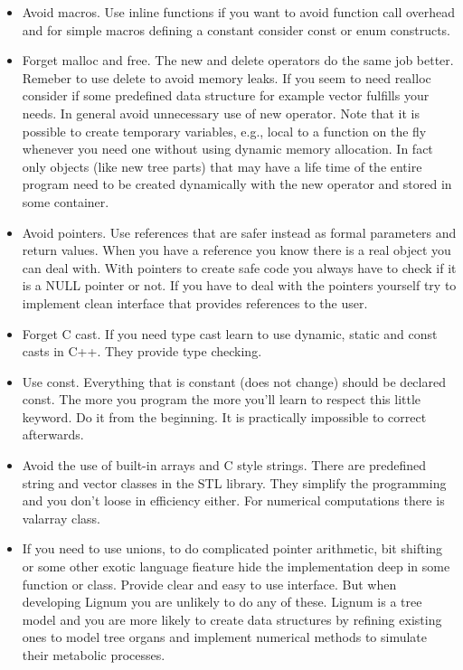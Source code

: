 \begin{itemize}
\item Avoid macros. Use inline functions if you want to avoid function
call overhead and for simple macros defining a constant consider const
or enum constructs.
\item Forget malloc and free. The new and delete operators do the
same job better.  Remeber to use  delete to avoid memory leaks. If you
seem to  need realloc consider  if some predefined data  structure for
example vector fulfills your  needs.  In general avoid unnecessary use
of  new  operator.  Note  that  it  is  possible to  create  temporary
variables, e.g., local to a function  on the fly whenever you need one
without using  dynamic memory allocation.  In fact only  objects (like
new tree parts)  that may have a life time of  the entire program need
to be  created dynamically  with the new  operator and stored  in some
container.
\item Avoid pointers. Use references that are safer instead as
formal parameters  and return  values. When you  have a  reference you
know  there is  a real  object you  can deal  with.  With  pointers to
create safe code you  always have to check if it is  a NULL pointer or
not. If you  have to deal with the pointers  yourself try to implement
clean interface that provides references to the user.
\item Forget C cast. If you need type cast learn to use dynamic,
static and const casts in C++. They provide type checking.
\item Use const. Everything that is constant (does not change) should
be declared const. The more you program the more you'll learn to
respect this little keyword. Do it from the beginning. It is
practically impossible to correct afterwards.
\item Avoid the use of built-in arrays and C style strings. There are
predefined string and vector classes in the STL library. They simplify
the programming and you don't loose in efficiency either. For
numerical computations there is valarray class. 
\item If you need to use unions, to do complicated pointer arithmetic, bit
shifting   or   some  other   exotic   language   fieature  hide   the
implementation deep in some function or class.  Provide clear and easy
to use  interface. But when developing  Lignum you are  unlikely to do
any of these. Lignum is a tree model and you are more likely to create
data structures  by refining  existing ones to  model tree  organs and
implement numerical methods to simulate their metabolic processes.

\end{itemize}

